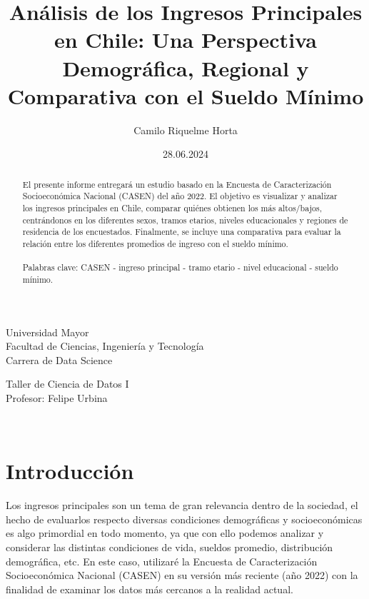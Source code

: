 \documentclass{article}
\title{\textbf{Análisis de los Ingresos Principales en Chile: Una Perspectiva Demográfica, Regional y Comparativa con el Sueldo Mínimo}}
\author{Camilo Riquelme Horta}
\date{28.06.2024}
\begin{document}
	
	\begin{minipage}{0.5\textwidth}
		\begin{flushleft}
			Universidad Mayor \\Facultad de Ciencias, Ingeniería y Tecnología \\Carrera de Data Science
		\end{flushleft}
	\end{minipage}
	\begin{minipage}{0.5\textwidth}
		\begin{flushright}
			Taller de Ciencia de Datos I \\Profesor: Felipe Urbina
		\end{flushright}
	\end{minipage}\\
	
	\begin{minipage}{450px}
		\centering
		\maketitle
	\end{minipage}
	
	\begin{abstract}
		El presente informe entregará un estudio basado en la Encuesta de Caracterización Socioeconómica Nacional (CASEN) del año 2022. El objetivo es visualizar y analizar los ingresos principales en Chile, comparar quiénes obtienen los más altos/bajos, centrándonos en los diferentes sexos, tramos etarios, niveles educacionales y regiones de residencia de los encuestados. Finalmente, se incluye una comparativa para evaluar la relación entre los diferentes promedios de ingreso con el sueldo mínimo.
		\\\\Palabras clave: CASEN - ingreso principal - tramo etario - nivel educacional - sueldo mínimo.
	\end{abstract}
	
	\section*{Introducción}
	Los ingresos principales son un tema de gran relevancia dentro de la sociedad, el hecho de evaluarlos respecto diversas condiciones demográficas y socioeconómicas es algo primordial en todo momento, ya que con ello podemos analizar y considerar las distintas condiciones de vida, sueldos promedio, distribución demográfica, etc. En este caso, utilizaré la Encuesta de Caracterización Socioeconómica Nacional (CASEN) en su versión más reciente (año 2022) con la finalidad de examinar los datos más cercanos a la realidad actual. \\
	
\end{document}
